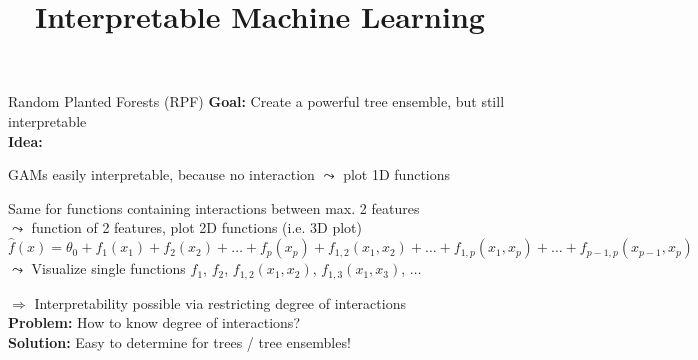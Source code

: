 \documentclass[10pt,compress,t,notes=noshow, xcolor=table]{beamer}
\title{Interpretable Machine Learning}
\begin{document}



\begin{framev}[align=top]{Random Planted Forests (RPF) %
}
\textbf{Goal:} Create a powerful tree ensemble, but still interpretable\\
\spacer[0.25]
\textbf{Idea:}
\begin{itemizeM}
\item GAMs easily interpretable, because no interaction $\leadsto$ plot 1D functions\\
\spacer[0.25]
\item Same for functions containing interactions between max. 2 features\\
$\leadsto$ function of 2 features, plot 2D functions (i.e. 3D plot)
$$
\hat{f}(x) = \theta_0 + f_1(x_1) + f_2(x_2) + \ldots + f_p(x_p) + f_{1,2}(x_1, x_2) + \ldots + f_{1,p}(x_1, x_p) + \ldots + f_{p-1,p}(x_{p-1}, x_p)
$$
$\leadsto$ Visualize single functions $f_1$, $f_2$, $f_{1,2}(x_1, x_2)$, $f_{1,3}(x_1, x_3)$, $\ldots$
\end{itemizeM}
$\Rightarrow$ Interpretability possible via restricting degree of interactions\\
\spacer[0.25]
\textbf{Problem:} How to know degree of interactions?\\
\spacer[0.25]
\textbf{Solution:} Easy to determine for trees / tree ensembles!
\end{framev}
\end{document}
